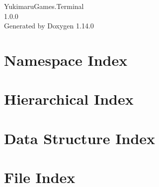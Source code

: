 \documentclass[twoside]{book}
\newcommand{\+}{\discretionary{\mbox{\scriptsize$\hookleftarrow$}}{}{}}
\newcommand{\clearemptydoublepage}{%
    \newpage{\pagestyle{empty}\cleardoublepage}%
  }
\begin{document}
  \raggedbottom
    \hypersetup{pageanchor=false,
                bookmarksnumbered=true,
                pdfencoding=unicode
               }
  \begin{titlepage}
  \vspace*{7cm}
  \begin{center}%
  {\Large Yukimaru\+Games.\+Terminal}\\
  [1ex]\large 1.\+0.\+0 \\
  \vspace*{1cm}
  {\large Generated by Doxygen 1.14.0}\\
  \end{center}
  \end{titlepage}
  \clearemptydoublepage
  \tableofcontents
  \clearemptydoublepage
  \hypersetup{pageanchor=true}

\chapter{Namespace Index}

\chapter{Hierarchical Index}

\chapter{Data Structure Index}

\chapter{File Index}

\end{document}
